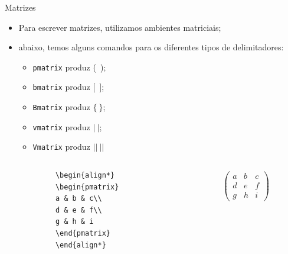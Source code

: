 \documentclass[c]{beamer}
\begin{document}
{\begin{frame}[fragile]{\sc Matrizes}
	\begin{itemize}
		\setlength\itemsep{0.3cm}
   \item Para escrever {\color{blue} matrizes}, utilizamos ambientes matriciais;
   \item abaixo, temos alguns comandos para os diferentes {\color{blue} tipos de delimitadores}:
   \begin{itemize}
   	\item \verb|pmatrix| produz (\ );
   	\item \verb|bmatrix| produz [\ ];
   	\item \verb|Bmatrix| produz $\{\ \}$;
   	\item \verb|vmatrix| produz $|\ |$;
   	\item \verb|Vmatrix| produz $||\ ||$
   \end{itemize}
\end{itemize} 
	\begin{columns}
		\begin{column}[t]{0.3\textwidth}
			\begin{verbatim}
			\begin{align*}
			\begin{pmatrix}
			a & b & c\\
			d & e & f\\
			g & h & i
			\end{pmatrix}
			\end{align*}
			\end{verbatim}
		\end{column}
		
		\begin{column}[t]{0.3\textwidth}			
			\begin{align*}
			\begin{pmatrix}
			a & b & c\\
			d & e & f\\
			g & h & i
			\end{pmatrix}
			\end{align*}		
		\end{column}
	\end{columns}

\end{frame}


}
\end{document}
